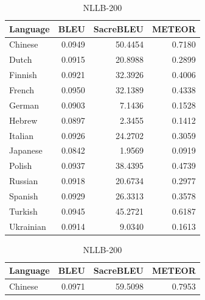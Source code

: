 \documentclass[a4paper]{article}
\begin{document}
\begin{table}[htbp]
    \centering
    \begin{minipage}{0.49\linewidth}
        \footnotesize
        \begin{tabular}{|l|r|r|r|}
            \hline
            \textbf{Language} & \textbf{BLEU} & \textbf{SacreBLEU} & \textbf{METEOR} \\
            \hline
            Chinese           & 0.0949        & 50.4454            & 0.7180          \\
            Dutch             & 0.0915        & 20.8988            & 0.2899          \\
            Finnish           & 0.0921        & 32.3926            & 0.4006          \\
            French            & 0.0950        & 32.1389            & 0.4338          \\
            German            & 0.0903        & 7.1436             & 0.1528          \\
            Hebrew            & 0.0897        & 2.3455             & 0.1412          \\
            Italian           & 0.0926        & 24.2702            & 0.3059          \\
            Japanese          & 0.0842        & 1.9569             & 0.0919          \\
            Polish            & 0.0937        & 38.4395            & 0.4739          \\
            Russian           & 0.0918        & 20.6734            & 0.2977          \\
            Spanish           & 0.0929        & 26.3313            & 0.3578          \\
            Turkish           & 0.0945        & 45.2721            & 0.6187          \\
            Ukrainian         & 0.0914        & 9.0340             & 0.1613          \\
            \hline
        \end{tabular}
        \caption{NLLB-200}
    \end{minipage}
    \begin{minipage}{0.49\linewidth}
        \footnotesize
        \begin{tabular}{|l|r|r|r|}
            \hline
            \textbf{Language} & \textbf{BLEU} & \textbf{SacreBLEU} & \textbf{METEOR} \\
            \hline
            Chinese           & 0.0971        & 59.5098            & 0.7953          \\

\end{tabular}
\end{minipage}
\end{table}
\end{document}
